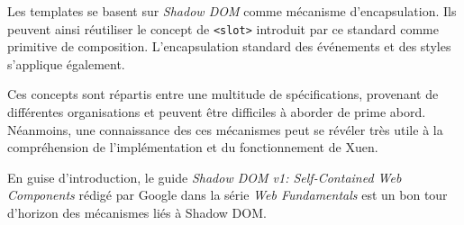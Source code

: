 Les templates se basent sur \emph{Shadow DOM} comme mécanisme d'encapsulation. Ils peuvent ainsi réutiliser le concept de \texttt{<slot>} introduit par ce standard comme primitive de composition. L'encapsulation standard des événements et des styles s'applique également.

Ces concepts sont répartis entre une multitude de spécifications, provenant de différentes organisations et peuvent être difficiles à aborder de prime abord. Néanmoins, une connaissance des ces mécanismes peut se révéler très utile à la compréhension de l'implémentation et du fonctionnement de Xuen.

En guise d'introduction, le guide \emph{Shadow DOM v1: Self-Contained Web Components} \cite{google-shadowdom} rédigé par Google dans la série \emph{Web Fundamentals} est un bon tour d'horizon des mécanismes liés à Shadow DOM.



